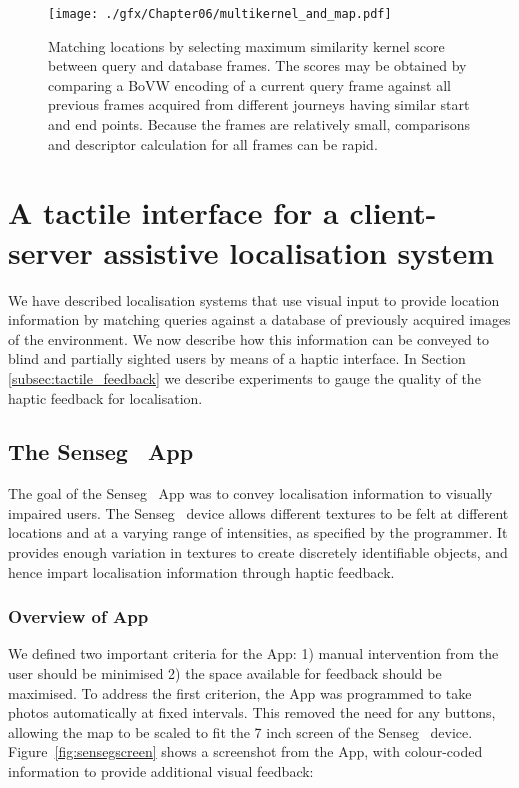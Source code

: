 \begin{figure}
\centering
\texttt{[image: ./gfx/Chapter06/multikernel\_and\_map.pdf]}
\caption{Matching locations by selecting maximum similarity kernel score between query and database frames.  The scores may be obtained by comparing a BoVW encoding of a current query frame against all previous frames acquired from different journeys having similar start and end points. Because the frames are relatively small, comparisons and descriptor calculation for all frames can be rapid.}
\label{fig:matching_from_kernels}
\end{figure}


\section{A tactile interface for a client-server assistive localisation system}
\label{sec:tactile}
We have described localisation systems that use visual input to provide location information by matching queries against a database of previously acquired images of the environment. We now describe how this information can be conveyed to blind and partially sighted users by means of a haptic interface. In Section \ref{subsec:tactile_feedback} we describe experiments to gauge the quality of the haptic feedback for localisation.

\subsection{The Senseg\texttrademark~ App}
The goal of the Senseg\texttrademark~ App was to convey localisation information to visually impaired users. The Senseg\texttrademark~ device allows different textures to be felt at different locations and at a varying range of intensities, as specified by the programmer. It provides enough variation in textures to create discretely identifiable objects, and hence impart localisation information through haptic feedback.

\subsubsection{Overview of App} 
We defined two important criteria for the App: 1) manual intervention from the user should be minimised 2) the space available for feedback should be maximised. To address the first criterion, the App was programmed to take photos automatically at fixed intervals. This removed the need for any buttons, allowing the map to be scaled to fit the 7 inch screen of the Senseg\texttrademark~ device. Figure~\ref{fig:sensegscreen} shows a screenshot from the App, with colour-coded information to provide additional visual feedback:


